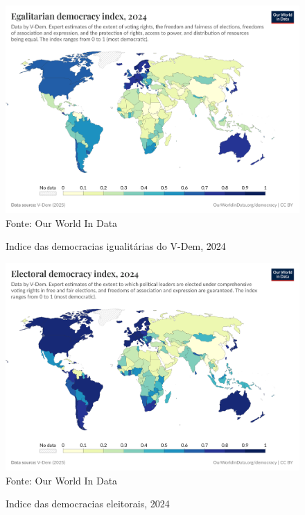 \begin{figure}[ht]
    \centering
    \caption{Indice das democracias igualitárias do V-Dem, 2024}
    \includegraphics[width=1\linewidth]{figuras/democracia/egalitarian-democracy-index-vdem.png}
    \label{fig:egalitarian-democracy-index-vdem}
    \footnotesize{Fonte: Our World In Data}
\end{figure}

\begin{figure}[ht]
    \centering
    \caption{Indice das democracias eleitorais, 2024}
    \includegraphics[width=1\linewidth]{figuras/democracia/electoral-democracy-index.png}
    \label{fig:electoral-democracy-index}
    \footnotesize{Fonte: Our World In Data}
\end{figure}

